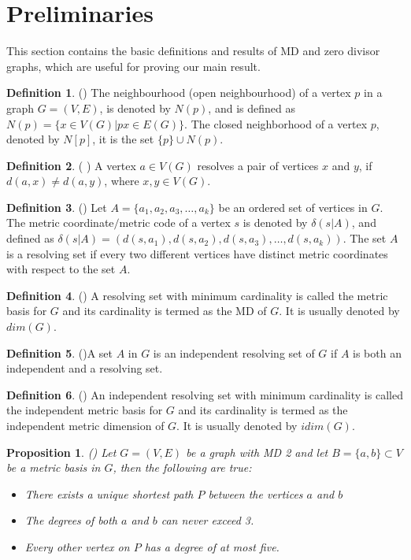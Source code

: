 \documentclass[]{interact}
\theoremstyle{plain}%
\newtheorem{proposition}{Proposition}[section]
\theoremstyle{definition}
\newtheorem{definition}{Definition}[section]
\theoremstyle{remark}
\begin{document}
 \section{Preliminaries}
This section contains the basic definitions and results of MD and zero divisor graphs, which are useful for proving our main result.
 \begin{definition}(\cite{su})
\noindent The neighbourhood (open neighbourhood) of a vertex $p$ in a graph $G=(V, E)$, is denoted by $N(p)$, and is defined as 
$N(p) = \{x \in V(G) | px \in E(G)\}.$ The closed neighborhood of a vertex $p$, denoted by $N[p]$, it is the set $\{p\} \cup
N(p)$.
 \end{definition}
  \begin{definition}(\cite{cht} )
A vertex $a\in V(G)$ resolves a pair of vertices $x$ and $y$, if $d(a,x)\neq d(a,y)$, where $x, y \in V(G)$.
 \end{definition}
 \begin{definition}(\cite{ha})		
\noindent Let  $A=\{a_1, a_2, a_3, \ldots,a_k\}$ be an ordered set of vertices in $G$. The metric coordinate$/$metric code of a vertex $s$ is denoted by $\delta(s|A)$, and defined as $\delta(s|A)=(d(s,a_1),d(s,a_2),d(s,a_3), \ldots,d(s,a_k))$. The set $A$ is a resolving set if {every two different vertices have distinct metric coordinates} with respect to the set $A$.
   \end{definition}   
    \begin{definition}(\cite{ha}) 
  A resolving set with minimum cardinality is called the metric basis for $G$ and its cardinality is termed as the MD of $G$. It is usually denoted by $dim(G).$ 
 \end{definition}
  \begin{definition}(\cite{cht})\label{defn1}
 \noindent A set $A$ in $G$ is an independent resolving set of $G$ if $A$ is both an independent and a resolving set.
 \end{definition}  
 \begin{definition}(\cite{cht}) \label{defn2}
 An independent resolving set with minimum cardinality is called the independent metric basis for $G$ and its cardinality is termed as the independent metric dimension of $G$. It is usually denoted by $idim(G)$. 
 \end{definition}  
\noindent \begin{proposition}(\cite{kh})
Let $G=(V,E)$ be a graph with MD 2 and let $B=\{a,b\}\subset V$ be a metric basis in $G$, then the following are true:
\begin{itemize}
\item There exists a unique shortest path $P$ between the vertices $a$ and $b$
\item The degrees of both $a$ and $b$ can never exceed 3.
\item Every other vertex on $P$ has a degree of at most five. 
\end{itemize}	
\end{proposition}
   
\end{document}
